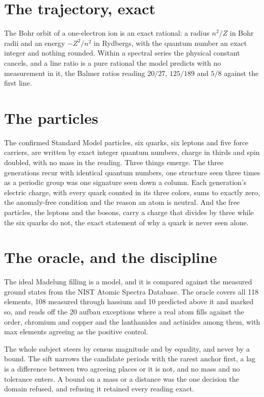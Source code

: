 \section{The trajectory, exact}

The Bohr orbit of a one-electron ion is an exact rational: a radius $n^2/Z$ in Bohr radii and an energy
$-Z^2/n^2$ in Rydbergs, with the quantum number an exact integer and nothing rounded. Within a spectral
series the physical constant cancels, and a line ratio is a pure rational the model predicts with no
measurement in it, the Balmer ratios reading $20/27$, $125/189$ and $5/8$ against the first line.

\section{The particles}

The confirmed Standard Model particles, six quarks, six leptons and five force carriers, are written by
exact integer quantum numbers, charge in thirds and spin doubled, with no mass in the reading. Three
things emerge. The three generations recur with identical quantum numbers, one structure seen three
times as a periodic group was one signature seen down a column. Each generation's electric charge, with
every quark counted in its three colors, sums to exactly zero, the anomaly-free condition and the reason
an atom is neutral. And the free particles, the leptons and the bosons, carry a charge that divides by
three while the six quarks do not, the exact statement of why a quark is never seen alone.

\section{The oracle, and the discipline}

The ideal Madelung filling is a model, and it is compared against the measured ground states from the NIST
Atomic Spectra Database. The oracle covers all 118 elements, 108 measured through hassium and 10
predicted above it and marked so, and reads off the 20 aufbau exceptions where a real atom fills against
the order, chromium and copper and the lanthanides and actinides among them, with max elements agreeing
as the positive control.

The whole subject steers by census magnitude and by equality, and never by a bound. The sift narrows the
candidate periods with the rarest anchor first, a lag is a difference between two agreeing places or it
is not, and no mass and no tolerance enters. A bound on a mass or a distance was the one decision the
domain refused, and refusing it retained every reading exact.
